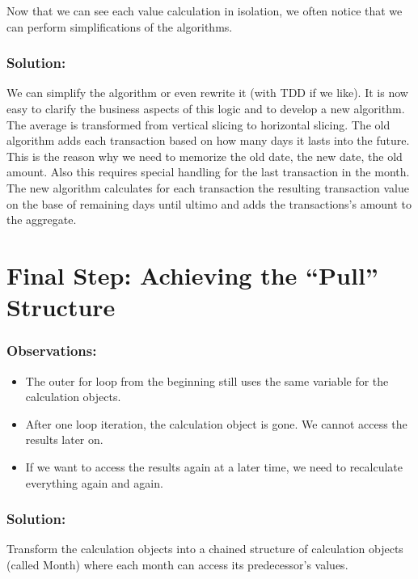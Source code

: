 \documentclass[a4paper,fleqn,titlepage,11pt]{article}
\begin{document}
Now that we can see each value calculation in isolation, we often notice that we can perform simplifications of the algorithms. 

\subsubsection*{Solution:}

We can simplify the algorithm or even rewrite it (with TDD if we like). It is now easy to clarify the business aspects of this logic and to develop a new algorithm. The average is transformed from vertical slicing to horizontal slicing. The old algorithm adds each transaction based on how many days it lasts into the future. This is the reason why we need to memorize the old date, the new date, the old amount. Also this requires special handling for the last transaction in the month. The new algorithm calculates for each transaction the resulting transaction value on the base of remaining days until ultimo and adds the transactions's amount to the aggregate.

\section*{Final Step: Achieving the ``Pull'' Structure}

\subsubsection*{Observations:}

\begin{itemize}
\item The outer for loop from the beginning still uses the same variable for the calculation objects.
\item After one loop iteration, the calculation object is gone. We cannot access the results later on.
\item If we want to access the results again at a later time, we need to recalculate everything again and again.
\end{itemize}

\subsubsection*{Solution:}

Transform the calculation objects into a chained structure of calculation objects (called Month) where each month can access its predecessor's values.
\end{document}
